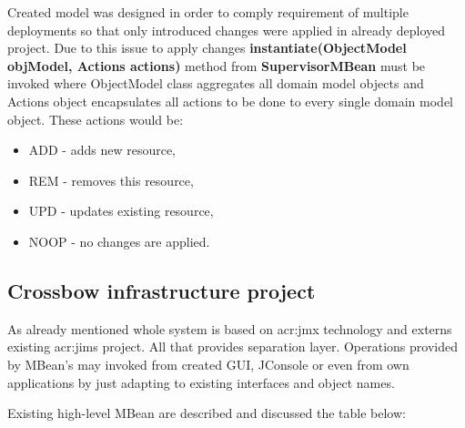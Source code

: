 \documentclass[11pt]{book}
\begin{document}
		Created model was designed in order to comply requirement of multiple deployments so that only introduced changes
		were applied in already deployed project. Due to this issue to apply changes \textbf{instantiate(ObjectModel
		objModel, Actions actions)} method from \textbf{SupervisorMBean} must be invoked where ObjectModel class
		aggregates all domain model objects and Actions object encapsulates all actions to be done to every single domain
		model object. These actions would be:

		\begin{itemize}
			\item {ADD - adds new resource,}
			\item {REM - removes this resource,}
			\item {UPD - updates existing resource,}
			\item {NOOP - no changes are applied.}
		\end{itemize}
		
		\subsection{Crossbow infrastructure project}
			\label{sec:impl:infrastructure}
			
			As already mentioned whole system is based on \gls{acr:jmx} technology and externs existing \gls{acr:jims} project. All that
			provides separation layer. Operations provided by MBean's may invoked from created GUI, JConsole or even
			from own applications by just adapting to existing interfaces and object names. 
			
			Existing high-level MBean are described and discussed the table below:
\end{document}
